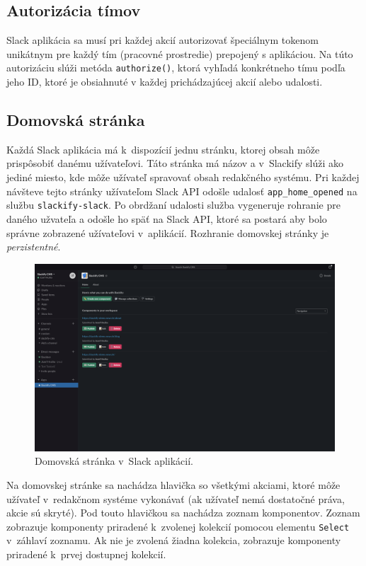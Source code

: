 \subsection{Autorizácia tímov}
Slack aplikácia sa musí pri každej akcií autorizovať špeciálnym tokenom  unikátnym pre každý tím (pracovné prostredie) prepojený s aplikáciou. Na túto autorizáciu slúži metóda \texttt{authorize()}, ktorá vyhľadá  konkrétneho tímu podľa jeho ID, ktoré je obsiahnuté v každej prichádzajúcej akcií alebo udalosti.

\subsection{Domovská stránka}
Každá Slack aplikácia má k~dispozícií jednu stránku, ktorej obsah môže prispôsobiť danému užívateľovi. Táto stránka má názov  a v~Slackify slúži ako jediné miesto, kde môže užívateľ spravovať obsah redakčného systému. Pri každej návšteve tejto stránky užívateľom Slack API odošle udalosť \texttt{app\_home\_opened} na službu \texttt{slackify-slack}. Po obrdžaní udalosti služba vygeneruje rohranie pre daného užvateľa a odošle ho späť na Slack API, ktoré sa postará aby bolo správne zobrazené užívateľovi v~aplikácií. Rozhranie domovskej stránky je \emph{perzistentné}.

\begin{figure}[h]
	\centering
	\includegraphics[scale=0.085]{obrazky-figures/screenshot_slack-home}
	\caption{Domovská stránka v~Slack aplikácií.}
\end{figure}

\noindent Na domovskej stránke sa nachádza hlavička so všetkými akciami, ktoré môže užívateľ v~redakčnom systéme vykonávať (ak užívateľ nemá dostatočné práva, akcie sú skryté). Pod touto hlavičkou sa nachádza zoznam komponentov. Zoznam zobrazuje komponenty priradené k~zvolenej kolekcií pomocou elementu \texttt{Select} v~záhlaví zoznamu. Ak nie je zvolená žiadna kolekcia, zobrazuje komponenty priradené k~prvej dostupnej kolekcií. \\

